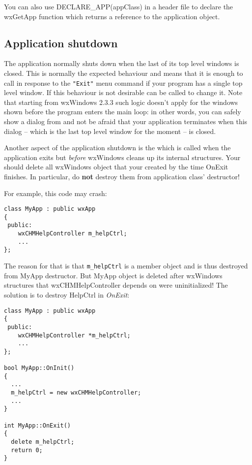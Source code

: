 You can also use DECLARE\_APP(appClass) in a header file to declare the wxGetApp function which returns
a reference to the application object.

\subsection{Application shutdown}\label{wxappshutdownoverview}

The application normally shuts down when the last of its top level windows is
closed. This is normally the expected behaviour and means that it is enough to
call  in response to the {\tt "Exit"} menu
command if your program has a single top level window. If this behaviour is not
desirable  can
be called to change it. Note that starting from wxWindows 2.3.3 such logic
doesn't apply for the windows shown before the program enters the main loop: in
other words, you can safely show a dialog from 
 and not be afraid that your application
terminates when this dialog -- which is the last top level window for the
moment -- is closed.


Another aspect of the application shutdown is the  
which is called when the application exits but {\it before} wxWindows cleans up
its internal structures. Your should delete all wxWindows object that your
created by the time OnExit finishes. In particular, do {\bf not} destroy them
from application class' destructor!

For example, this code may crash:

\begin{verbatim}
class MyApp : public wxApp
{
 public:
    wxCHMHelpController m_helpCtrl;
    ...
};
\end{verbatim}

The reason for that is that {\tt m\_helpCtrl} is a member object and is 
thus destroyed from MyApp destructor. But MyApp object is deleted after 
wxWindows structures that wxCHMHelpController depends on were 
uninitialized! The solution is to destroy HelpCtrl in {\it OnExit}:

\begin{verbatim}
class MyApp : public wxApp
{
 public:
    wxCHMHelpController *m_helpCtrl;
    ...
};

bool MyApp::OnInit()
{
  ...
  m_helpCtrl = new wxCHMHelpController;
  ...
}

int MyApp::OnExit()
{
  delete m_helpCtrl;
  return 0;
}
\end{verbatim}
